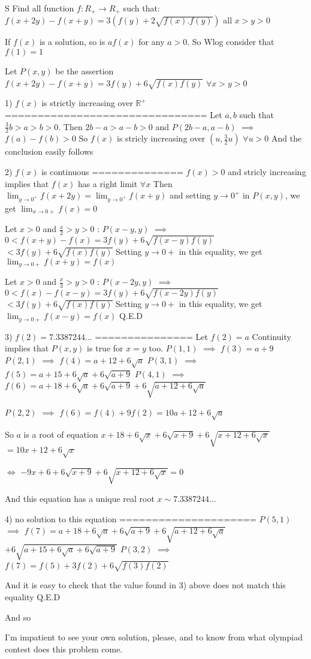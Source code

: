 \begin{solution}
	\begin{tcolorbox}S
Find all function $f: R_{+} \to R_{+}$ such that:
$f(x+2y)-f(x+y)=3(f(y)+2\sqrt{f(x).f(y)})$ all $x>y>0$\end{tcolorbox}
If $f(x)$ is a solution, so is $af(x)$ for any $a>0$. So Wlog consider that $f(1)=1$

Let $P(x,y)$ be the assertion $f(x+2y)-f(x+y)=3f(y)+6\sqrt{f(x)f(y)}$ $\forall x>y>0$

1) $f(x)$ is strictly increasing over $\mathbb R^+$
===============================
Let $a,b$ such that $\frac 32b>a>b>0$. Then $2b-a>a-b>0$ and $P(2b-a,a-b)$ $\implies$ $f(a)-f(b)>0$
So $f(x)$ is stricly increasing over $(u,\frac 32u)$ $\forall u>0$
And the conclusion easily follows

2) $f(x)$ is continuous
==============
$f(x)>0$ and stricly increasing implies that $f(x)$ has a right limit $\forall x$
Then $\lim_{y\to 0^+}f(x+2y)=\lim_{y\to 0^+}f(x+y)$ and setting $y\to 0^+$ in $P(x,y)$, we get $\lim_{x\to 0+}f(x)=0$

Let $x>0$ and $\frac x2>y>0$ : $P(x-y,y)$ $\implies$ $0<f(x+y)-f(x)=3f(y)+6\sqrt{f(x-y)f(y)}$ $<3f(y)+6\sqrt{f(x)f(y)}$
Setting $y\to 0+$ in this equality, we get $\lim_{y\to 0+}f(x+y)=f(x)$

Let $x>0$ and $\frac x3>y>0$ : $P(x-2y,y)$ $\implies$ $0<f(x)-f(x-y)=3f(y)+6\sqrt{f(x-2y)f(y)}$ $<3f(y)+6\sqrt{f(x)f(y)}$
Setting $y\to 0+$ in this equality, we get $\lim_{y\to 0+}f(x-y)=f(x)$
Q.E.D

3) $f(2)=7.3387244...$
===============
Let $f(2)=a$
Continuity implies that $P(x,y)$ is true for $x=y$ too.
$P(1,1)$ $\implies$ $f(3)=a+9$
$P(2,1)$ $\implies$ $f(4)=a+12+6\sqrt a$
$P(3,1)$ $\implies$ $f(5)=a+15+6\sqrt a+6\sqrt{a+9}$
$P(4,1)$ $\implies$ $f(6)=a+18+6\sqrt a +6\sqrt{a+9}+6\sqrt{a+12+6\sqrt a}$

$P(2,2)$ $\implies$ $f(6)=f(4)+9f(2)=10a+12+6\sqrt a$

So $a$ is a root of equation $x+18+6\sqrt x +6\sqrt{x+9}+6\sqrt{x+12+6\sqrt x}$ $=10x+12+6\sqrt x$

$\iff$ $-9x+6+6\sqrt{x+9}+6\sqrt{x+12+6\sqrt x}=0$

And this equation has a unique real root $x\sim 7.3387244...$

4) no solution to this equation
=====================
$P(5,1)$ $\implies$ $f(7)=a+18+6\sqrt a +6\sqrt{a+9}+6\sqrt{a+12+6\sqrt a}$ $+6\sqrt{a+15+6\sqrt a+6\sqrt{a+9}}$
$P(3,2)$ $\implies$ $f(7)=f(5)+3f(2)+6\sqrt{f(3)f(2)}$

And it is easy to check that the value found in 3) above does not match this equality
Q.E.D

And so 

I'm impatient to see your own solution, please, and to know from what olympiad contest does this problem come.
\end{solution}




